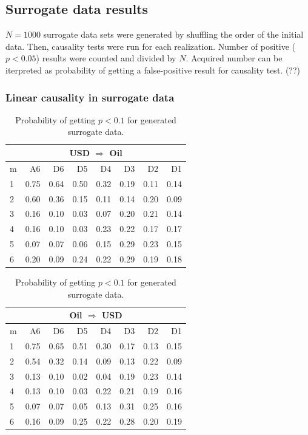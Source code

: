 \subsection{Surrogate data results}

$N=1000$ surrogate data sets were generated by shuffling the order of the initial data.
Then, causality tests were run for each realization.
Number of positive ($p < 0.05$) results were counted and divided by $N$.
Acquired number can be iterpreted as probability of getting a false-positive result for causality test. (??)

\subsubsection{Linear causality in surrogate data}

\begin{table}[H]
\begin{center}
\begin{tabular}{l|r r r r r r r}
\multicolumn{8}{c}{USD $\Rightarrow$ Oil}\\
\hline\hline
m & A6 & D6 & D5 & D4 & D3 & D2 & D1 \\
\hline
1 & 0.75 & 0.64 & 0.50 & 0.32 & 0.19 & 0.11 & 0.14 \\
2 & 0.60 & 0.36 & 0.15 & 0.11 & 0.14 & 0.20 & 0.09 \\
3 & 0.16 & 0.10 & 0.03 & 0.07 & 0.20 & 0.21 & 0.14 \\
4 & 0.16 & 0.10 & 0.03 & 0.23 & 0.22 & 0.17 & 0.17 \\
5 & 0.07 & 0.07 & 0.06 & 0.15 & 0.29 & 0.23 & 0.15 \\
6 & 0.20 & 0.09 & 0.24 & 0.22 & 0.29 & 0.19 & 0.18 \\
\hline\hline
\end{tabular}
\caption{Probability of getting $p < 0.1$ for generated surrogate data.}
\end{center}
\end{table}


\begin{table}[H]
\begin{center}
\begin{tabular}{l|r r r r r r r}
\multicolumn{8}{c}{Oil $\Rightarrow$ USD}\\
\hline\hline
m & A6 & D6 & D5 & D4 & D3 & D2 & D1 \\
\hline
1 & 0.75 & 0.65 & 0.51 & 0.30 & 0.17 & 0.13 & 0.15 \\
2 & 0.54 & 0.32 & 0.14 & 0.09 & 0.13 & 0.22 & 0.09 \\
3 & 0.13 & 0.10 & 0.02 & 0.04 & 0.19 & 0.23 & 0.14 \\
4 & 0.13 & 0.10 & 0.03 & 0.22 & 0.21 & 0.19 & 0.16 \\
5 & 0.07 & 0.07 & 0.05 & 0.13 & 0.31 & 0.25 & 0.16 \\
6 & 0.16 & 0.09 & 0.25 & 0.22 & 0.28 & 0.20 & 0.19 \\
\hline\hline
\end{tabular}
\caption{Probability of getting $p < 0.1$ for generated surrogate data.}
\end{center}
\end{table}

